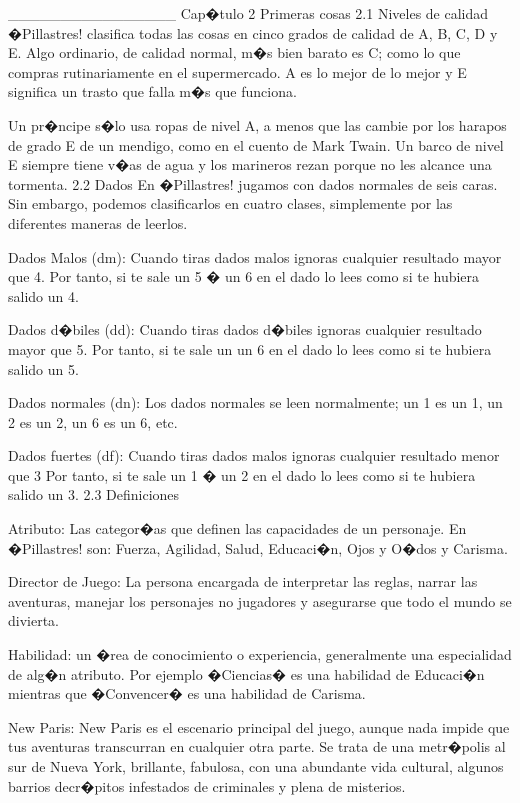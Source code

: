 ________________
Cap�tulo 2 Primeras cosas
2.1 Niveles de calidad
�Pillastres! clasifica todas las cosas en cinco grados de calidad de A, B, C, D y E. Algo ordinario, de calidad normal, m�s bien barato es C; como lo que compras rutinariamente en el supermercado. A es lo mejor de lo mejor y E significa un trasto que falla m�s que funciona.


Un pr�ncipe s�lo usa ropas de nivel A, a menos que las cambie por los harapos de grado E de un mendigo, como en el cuento de Mark Twain. Un barco de nivel E siempre tiene v�as de agua y los marineros rezan porque no les alcance una tormenta. 
2.2 Dados
En �Pillastres! jugamos con dados normales de seis caras. Sin embargo, podemos clasificarlos en cuatro clases, simplemente por las diferentes maneras de leerlos.


Dados Malos (dm): 
Cuando tiras dados malos ignoras cualquier resultado mayor que 4. Por tanto, si te sale un 5 � un 6 en el dado lo lees como si te hubiera salido un 4.


Dados d�biles (dd): 
Cuando tiras dados d�biles ignoras cualquier resultado mayor que 5. Por tanto, si te sale un un 6 en el dado lo lees como si te hubiera salido un 5.


Dados normales (dn): 
Los dados normales se leen normalmente; un 1 es un 1, un 2 es un 2, un 6 es un 6, etc.


Dados fuertes (df): 
Cuando tiras dados malos ignoras cualquier resultado menor que 3 Por tanto, si te sale un 1 � un 2 en el dado lo lees como si te hubiera salido un 3.
2.3 Definiciones


Atributo: 
Las categor�as que definen las capacidades de un personaje. En �Pillastres! son: Fuerza, Agilidad, Salud, Educaci�n, Ojos y O�dos y Carisma.


Director de Juego: 
La persona encargada de interpretar las reglas, narrar las aventuras, manejar los personajes no jugadores y asegurarse que todo el mundo se divierta.


Habilidad: 
un �rea de conocimiento o experiencia, generalmente una especialidad de alg�n atributo. Por ejemplo �Ciencias� es una habilidad de Educaci�n mientras que �Convencer� es una habilidad de Carisma.


New Paris: 
New Paris es el escenario principal del juego, aunque nada impide que tus aventuras transcurran en cualquier otra parte. Se trata de una metr�polis al sur de Nueva York, brillante, fabulosa, con una abundante vida cultural, algunos barrios decr�pitos infestados de criminales y plena de misterios.


